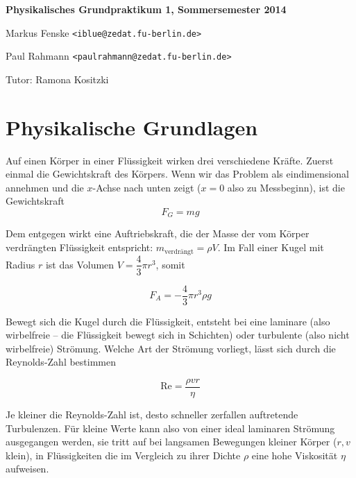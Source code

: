 \documentclass[a4paper,german,12pt,smallheadings]{scrartcl}
\begin{document}
\allowdisplaybreaks %
\begin{center}
\bfseries %
\sffamily %
\vspace{-40pt}
Physikalisches Grundpraktikum 1, Sommersemester 2014

Markus Fenske \texttt{<iblue@zedat.fu-berlin.de>}

Paul Rahmann \texttt{<paulrahmann@zedat.fu-berlin.de>}

Tutor: Ramona Kositzki
\vspace{-10pt}
\end{center}

\section*{Physikalische Grundlagen}

Auf einen Körper in einer Flüssigkeit wirken drei verschiedene Kräfte. Zuerst
einmal die Gewichtskraft des Körpers. Wenn wir das Problem als eindimensional
annehmen und die $x$-Achse nach unten zeigt ($x = 0$ also zu Messbeginn), ist
die Gewichtskraft
\begin{equation}
  F_G = mg
\end{equation}

Dem entgegen wirkt eine Auftriebskraft, die der Masse der vom Körper verdrängten
Flüssigkeit entspricht: $m_\text{verdrängt} = \rho V$. Im Fall einer Kugel mit
Radius $r$ ist das Volumen $V = \dfrac{4}{3} \pi r^3$, somit

\begin{equation}
  F_A = -\frac{4}{3} \pi r^3 \rho g
\end{equation}

Bewegt sich die Kugel durch die Flüssigkeit, entsteht bei eine laminare (also
wirbelfreie -- die Flüssigkeit bewegt sich in Schichten) oder turbulente (also
nicht wirbelfreie) Strömung. Welche Art der Strömung vorliegt, lässt sich
durch die Reynolds-Zahl bestimmen

\begin{equation}
  \text{Re} = \frac{\rho v r}{\eta}
\end{equation}

Je kleiner die Reynolds-Zahl ist, desto schneller zerfallen auftretende
Turbulenzen. Für kleine Werte kann also von einer ideal laminaren Strömung
ausgegangen werden, sie tritt auf bei langsamen Bewegungen kleiner Körper
($r,v$ klein), in Flüssigkeiten die im Vergleich zu ihrer Dichte $\rho$ eine
hohe Viskosität $\eta$ aufweisen.
\end{document}
